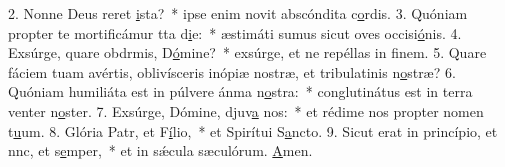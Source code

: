 2. Nonne Deus reret \uline{i}sta?~* ipse enim novit abscóndita c\uline{o}rdis.
3. Quóniam propter te mortificámur tta d\uline{i}e:~* æstimáti sumus sicut oves occisi\uline{ó}nis.
4. Exsúrge, quare obdrmis, D\uline{ó}mine?~* exsúrge, et ne repéllas in f\uline{i}nem.
5. Quare fáciem tuam avértis, oblivísceris inópiæ nostræ, et tribulatinis n\uline{o}stræ?
6. Quóniam humiliáta est in púlvere ánma n\uline{o}stra:~* conglutinátus est in terra venter n\uline{o}ster.
7. Exsúrge, Dómine, djuv\uline{a} nos:~* et rédime nos propter nomen t\uline{u}um.
8. Glória Patr, et F\uline{í}lio,~* et Spirítui S\uline{a}ncto.
9. Sicut erat in princípio, et nnc, et s\uline{e}mper,~* et in sǽcula sæculórum. \uline{A}men.
